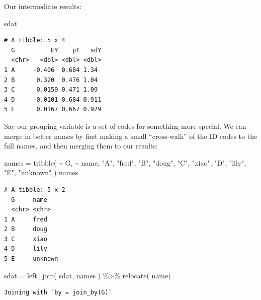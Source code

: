 \documentclass[
  letterpaper,
  DIV=11,
  numbers=noendperiod]{scrreprt}
\newenvironment{Shaded}{\begin{snugshade}}{\end{snugshade}}
\newcommand{\FunctionTok}[1]{\textcolor[rgb]{0.02,0.16,0.49}{#1}}
\newcommand{\NormalTok}[1]{\textcolor[rgb]{0.00,0.44,0.13}{#1}}
\newcommand{\OtherTok}[1]{\textcolor[rgb]{0.00,0.44,0.13}{#1}}
\newcommand{\SpecialCharTok}[1]{\textcolor[rgb]{0.25,0.44,0.63}{#1}}
\newcommand{\StringTok}[1]{\textcolor[rgb]{0.25,0.44,0.63}{#1}}
\begin{document}
Our intermediate results:

\begin{Shaded}
\begin{Highlighting}[]
\NormalTok{sdat}
\end{Highlighting}
\end{Shaded}

\begin{verbatim}
# A tibble: 5 x 4
  G          EY    pT   sdY
  <chr>   <dbl> <dbl> <dbl>
1 A     -0.406  0.684 1.34 
2 B      0.320  0.476 1.04 
3 C      0.0159 0.471 1.09 
4 D     -0.0101 0.684 0.911
5 E      0.0167 0.667 0.929
\end{verbatim}

Say our grouping variable is a set of codes for something more special.
We can merge in better names by first making a small ``cross-walk'' of
the ID codes to the full names, and then merging them to our results:

\begin{Shaded}
\begin{Highlighting}[]
\NormalTok{names }\OtherTok{=} \FunctionTok{tribble}\NormalTok{( }\SpecialCharTok{\textasciitilde{}}\NormalTok{ G, }\SpecialCharTok{\textasciitilde{}}\NormalTok{ name,}
                 \StringTok{"A"}\NormalTok{, }\StringTok{"fred"}\NormalTok{,}
                 \StringTok{"B"}\NormalTok{, }\StringTok{"doug"}\NormalTok{,}
                 \StringTok{"C"}\NormalTok{, }\StringTok{"xiao"}\NormalTok{,}
                 \StringTok{"D"}\NormalTok{, }\StringTok{"lily"}\NormalTok{,}
                 \StringTok{"E"}\NormalTok{, }\StringTok{"unknown"}\NormalTok{ )}
\NormalTok{names}
\end{Highlighting}
\end{Shaded}

\begin{verbatim}
# A tibble: 5 x 2
  G     name   
  <chr> <chr>  
1 A     fred   
2 B     doug   
3 C     xiao   
4 D     lily   
5 E     unknown
\end{verbatim}

\begin{Shaded}
\begin{Highlighting}[]
\NormalTok{sdat }\OtherTok{=} \FunctionTok{left\_join}\NormalTok{( sdat, names ) }\SpecialCharTok{\%\textgreater{}\%}
    \FunctionTok{relocate}\NormalTok{( name)}
\end{Highlighting}
\end{Shaded}

\begin{verbatim}
Joining with `by = join_by(G)`
\end{verbatim}
\end{document}
